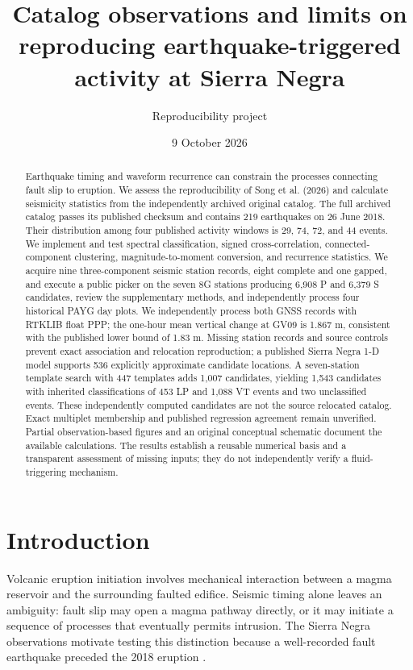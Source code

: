 \documentclass[11pt]{article}
\title{Catalog observations and limits on reproducing earthquake-triggered activity at Sierra Negra}
\author{Reproducibility project}
\date{9 October 2026}
\begin{document}
\maketitle
\begin{abstract}
Earthquake timing and waveform recurrence can constrain the processes connecting fault slip to eruption. We assess the reproducibility of Song et al. (2026) and calculate seismicity statistics from the independently archived original catalog. The full archived catalog passes its published checksum and contains 219 earthquakes on 26 June 2018. Their distribution among four published activity windows is 29, 74, 72, and 44 events. We implement and test spectral classification, signed cross-correlation, connected-component clustering, magnitude-to-moment conversion, and recurrence statistics. We acquire nine three-component seismic station records, eight complete and one gapped, and execute a public picker on the seven 8G stations producing 6,908 P and 6,379 S candidates, review the supplementary methods, and independently process four historical PAYG day plots. We independently process both GNSS records with RTKLIB float PPP; the one-hour mean vertical change at GV09 is 1.867 m, consistent with the published lower bound of 1.83 m. Missing station records and source controls prevent exact association and relocation reproduction; a published Sierra Negra 1-D model supports 536 explicitly approximate candidate locations. A seven-station template search with 447 templates adds 1,007 candidates, yielding 1,543 candidates with inherited classifications of 453 LP and 1,088 VT events and two unclassified events. These independently computed candidates are not the source relocated catalog. Exact multiplet membership and published regression agreement remain unverified. Partial observation-based figures and an original conceptual schematic document the available calculations. The results establish a reusable numerical basis and a transparent assessment of missing inputs; they do not independently verify a fluid-triggering mechanism.
\end{abstract}

\section{Introduction}
Volcanic eruption initiation involves mechanical interaction between a magma reservoir and the surrounding faulted edifice. Seismic timing alone leaves an ambiguity: fault slip may open a magma pathway directly, or it may initiate a sequence of processes that eventually permits intrusion. The Sierra Negra observations motivate testing this distinction because a well-recorded fault earthquake preceded the 2018 eruption \citep{bell2021,song2026}.
\end{document}
